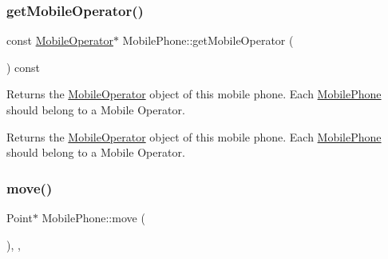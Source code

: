 \mbox{\label{class_mobile_phone_aba72025d08c382d8533e0cbb9166999b}} 
\subsubsection{\texorpdfstring{get\+Mobile\+Operator()}{getMobileOperator()}}
{\footnotesize\ttfamily const \hyperlink{class_mobile_operator}{Mobile\+Operator}$\ast$ Mobile\+Phone\+::get\+Mobile\+Operator (\begin{DoxyParamCaption}{ }\end{DoxyParamCaption}) const}

Returns the \hyperlink{class_mobile_operator}{Mobile\+Operator} object of this mobile phone. Each \hyperlink{class_mobile_phone}{Mobile\+Phone} should belong to a Mobile Operator. \begin{DoxyReturn}{Returns}
the \hyperlink{class_mobile_operator}{Mobile\+Operator} object of this mobile phone. Each \hyperlink{class_mobile_phone}{Mobile\+Phone} should belong to a Mobile Operator. 
\end{DoxyReturn}
\mbox{\label{class_mobile_phone_a785d0cac08252386603c702ad8f38c5b}} 
\subsubsection{\texorpdfstring{move()}{move()}}
{\footnotesize\ttfamily Point$\ast$ Mobile\+Phone\+::move (\begin{DoxyParamCaption}{ }\end{DoxyParamCaption})\hspace{0.3cm}{\ttfamily [inline]}, {\ttfamily [override]}, {\ttfamily [virtual]}}

